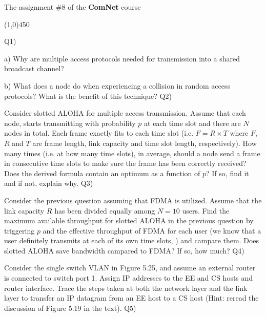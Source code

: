 \documentclass[10pt,letterpaper]{article}
\newcommand{\hl}{
\begin{center}
\line(1,0){450}
\end{center}}
\begin{document}
\Large
\begin{center}
The assignment \#8 of the \textbf{ComNet} course
\hl
\end{center}
Q1) 

a) Why are multiple access protocols needed for transmission into a shared broadcast channel?

b) What does a node do when experiencing a collision in random access protocols? What is the benefit of this technique?
\newline
\newline
Q2)

Consider slotted ALOHA for multiple access transmission. Assume that each node, starts transmitting with probability $p$ at each time slot and there are $N$ nodes in total. Each frame exactly fits to each time slot (i.e. $F=R\times T$ where $F$, $R$ and $T$ are frame length, link capacity and time slot length, respectively). How many times (i.e. at how many time slots), in average, should a node send a frame in consecutive time slots to make sure the frame has been correctly received? Does the derived formula contain an optimum as a function of $p$? If so, find it and if not, explain why.
\newline
\newline
Q3)

Consider the previous question assuming that FDMA is utilized. Assume that the link capacity $R$ has been divided equally among $N=10$ users. Find the maximum available throughput for slotted ALOHA in the previous question by triggering $p$ and the effective throughput of FDMA for each user (we know that a user definitely transmits at each of its own time slots, ) and campare them. Does slotted ALOHA save bandwidth campared to FDMA? If so, how much?
\newline
\newline
Q4)

Consider the single switch VLAN in Figure 5.25, and assume an external
router is connected to switch port 1. Assign IP addresses to the EE and CS
hosts and router interface. Trace the steps taken at both the network layer and the link layer to transfer an IP datagram from an EE host to a CS host (Hint: reread the discussion of Figure 5.19 in the text).
\newline\newline
Q5)
\end{document}
